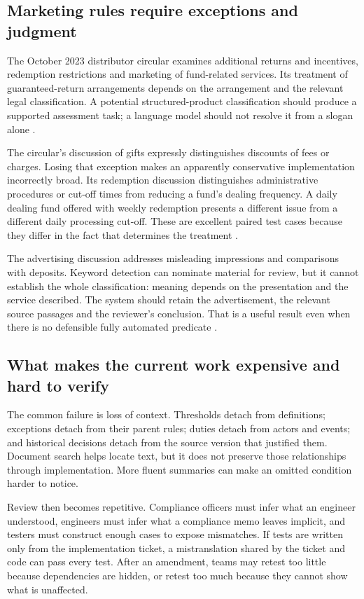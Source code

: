 \subsection{Marketing rules require exceptions and judgment}

The October 2023 distributor circular examines additional returns and incentives,
redemption restrictions and marketing of fund-related services. Its treatment of
guaranteed-return arrangements depends on the arrangement and the relevant legal
classification. A potential structured-product classification should produce a
supported assessment task; a language model should not resolve it from a slogan
alone \citep[paras.~5--11]{sfcmarketing}.

The circular's discussion of gifts expressly distinguishes discounts of fees or
charges. Losing that exception makes an apparently conservative implementation
incorrectly broad. Its redemption discussion distinguishes administrative
procedures or cut-off times from reducing a fund's dealing frequency. A daily
dealing fund offered with weekly redemption presents a different issue from a
different daily processing cut-off. These are excellent paired test cases because
they differ in the fact that determines the treatment
\citep[paras.~9--14]{sfcmarketing}.

The advertising discussion addresses misleading impressions and comparisons with
deposits. Keyword detection can nominate material for review, but it cannot
establish the whole classification: meaning depends on the presentation and the
service described. The system should retain the advertisement, the relevant
source passages and the reviewer's conclusion. That is a useful result even when
there is no defensible fully automated predicate
\citep[paras.~15--17]{sfcmarketing}.

\subsection{What makes the current work expensive and hard to verify}

The common failure is loss of context. Thresholds detach from definitions;
exceptions detach from their parent rules; duties detach from actors and events;
and historical decisions detach from the source version that justified them.
Document search helps locate text, but it does not preserve those relationships
through implementation. More fluent summaries can make an omitted condition
harder to notice.

Review then becomes repetitive. Compliance officers must infer what an engineer
understood, engineers must infer what a compliance memo leaves implicit, and
testers must construct enough cases to expose mismatches. If tests are written
only from the implementation ticket, a mistranslation shared by the ticket and
code can pass every test. After an amendment, teams may retest too little because
dependencies are hidden, or retest too much because they cannot show what is
unaffected.

